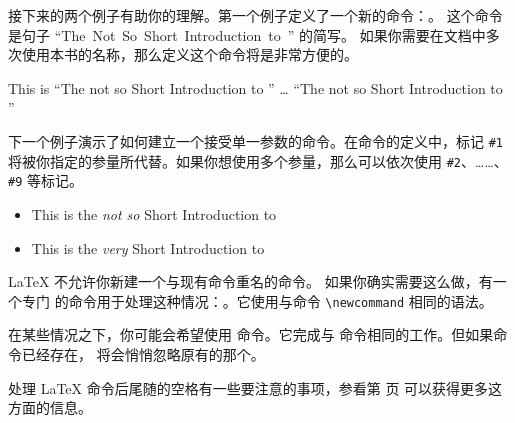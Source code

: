 接下来的两个例子有助你的理解。第一个例子定义了一个新的命令：。
这个命令是句子 ``The\ Not\ So\ Short\ Introduction\ to\ \LaTeXe'' 的简写。
如果你需要在文档中多次使用本书的名称，那么定义这个命令将是非常方便的。

\begin{example}
\newcommand{\tnss}{The not
    so Short Introduction to
    \LaTeXe}
This is ``\tnss'' \ldots{}
``\tnss''
\end{example}

下一个例子演示了如何建立一个接受单一参数的命令。在命令的定义中，标记 \verb|#1| 
将被你指定的参量所代替。如果你想使用多个参量，那么可以依次使用 \verb|#2|、……、
\verb|#9| 等标记。

\begin{example}
\newcommand{\txsit}[1]
 {This is the \emph{#1} Short
      Introduction to \LaTeXe}
\begin{itemize}
\item \txsit{not so}
\item \txsit{very}
\end{itemize}
\end{example}

\LaTeX{} 不允许你新建一个与现有命令重名的命令。 如果你确实需要这么做，有一个专门
的命令用于处理这种情况：。它使用与命令 \verb|\newcommand| 
相同的语法。

在某些情况之下，你可能会希望使用  命令。它完成与  
命令相同的工作。但如果命令已经存在，\LaTeXe{} 将会悄悄忽略原有的那个。

处理 \LaTeX{} 命令后尾随的空格有一些要注意的事项，参看第 \pageref{whitespace} 页
可以获得更多这方面的信息。


